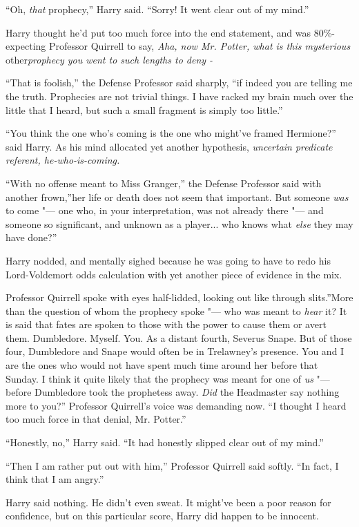 ``Oh, \emph{that} prophecy,'' Harry said. ``Sorry! It went clear out of
my mind.''

Harry thought he'd put too much force into the end statement, and was
80\%-expecting Professor Quirrell to say, \emph{Aha, now Mr. Potter,
what is this mysterious} other\emph{prophecy you went to such lengths to
deny -}

``That is foolish,'' the Defense Professor said sharply, ``if indeed you
are telling me the truth. Prophecies are not trivial things. I have
racked my brain much over the little that I heard, but such a small
fragment is simply too little.''

``You think the one who's coming is the one who might've framed
Hermione?'' said Harry. As his mind allocated yet another hypothesis,
\emph{uncertain predicate referent, he-who-is-coming.}

``With no offense meant to Miss Granger,'' the Defense Professor said
with another frown,''her life or death does not seem that important. But
someone \emph{was} to come "--- one who, in your interpretation, was not
already there "--- and someone so significant, and unknown as a
player... who knows what \emph{else} they may have done?''

Harry nodded, and mentally sighed because he was going to have to redo
his Lord-Voldemort odds calculation with yet another piece of evidence
in the mix.

Professor Quirrell spoke with eyes half-lidded, looking out like through
slits.''More than the question of whom the prophecy spoke "--- who was
meant to \emph{hear} it? It is said that fates are spoken to those with
the power to cause them or avert them. Dumbledore. Myself. You. As a
distant fourth, Severus Snape. But of those four, Dumbledore and Snape
would often be in Trelawney's presence. You and I are the ones who would
not have spent much time around her before that Sunday. I think it quite
likely that the prophecy was meant for one of \emph{us} "--- before
Dumbledore took the prophetess away. \emph{Did} the Headmaster say
nothing more to you?'' Professor Quirrell's voice was demanding now. ``I
thought I heard too much force in that denial, Mr. Potter.''

``Honestly, no,'' Harry said. ``It had honestly slipped clear out of my
mind.''

``Then I am rather put out with him,'' Professor Quirrell said softly.
``In fact, I think that I am angry.''

Harry said nothing. He didn't even sweat. It might've been a poor reason
for confidence, but on this particular score, Harry did happen to be
innocent.

